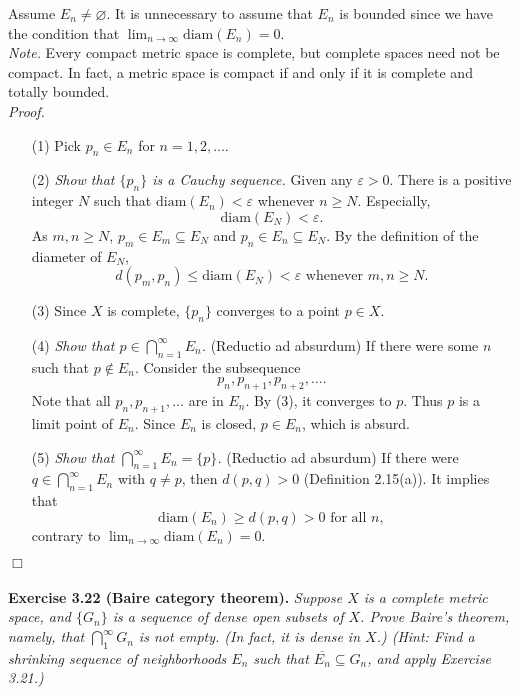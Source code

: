 \documentclass{article}
\begin{document}
Assume $E_n \neq \varnothing$. It is unnecessary to assume that $E_n$ is bounded
since we have the condition that $\lim_{n \to \infty} \mathrm{diam}(E_n) = 0$.\\

\emph{Note.}
Every compact metric space is complete, but complete spaces need not be compact.
In fact, a metric space is compact if and only if it is complete and totally bounded. \\

\emph{Proof.}
\begin{enumerate}
\item[(1)]
Pick $p_n \in E_n$ for $n = 1, 2, \ldots$.
\item[(2)]
\emph{Show that $\{p_n\}$ is a Cauchy sequence.}
Given any $\varepsilon > 0$.
There is a positive integer $N$ such that
$\mathrm{diam}(E_n) < \varepsilon$ whenever $n \geq N$.
Especially, $$\mathrm{diam}(E_N) < \varepsilon.$$
As $m, n \geq N$, $p_m \in E_m \subseteq E_N$ and $p_n \in E_n \subseteq E_N$.
By the definition of the diameter of $E_N$,
$$d(p_m,p_n) \leq \mathrm{diam}(E_N) < \varepsilon \text{ whenever } m,n \geq N.$$
\item[(3)]
Since $X$ is complete, $\{p_n\}$ converges to a point $p \in X$.
\item[(4)]
\emph{Show that $p \in \bigcap_{n=1}^{\infty} E_n$.}
(Reductio ad absurdum)
If there were some $n$ such that $p \not\in E_{n}$.
Consider the subsequence
$$p_{n}, p_{n+1}, p_{n+2}, \ldots.$$
Note that all $p_{n}, p_{n+1}, \ldots$ are in $E_n$.
By (3), it converges to $p$. Thus $p$ is a limit point of $E_n$.
Since $E_n$ is closed, $p \in E_n$, which is absurd.
\item[(5)]
\emph{Show that $\bigcap_{n=1}^{\infty} E_n = \{p\}$.}
(Reductio ad absurdum)
If there were $q \in \bigcap_{n=1}^{\infty} E_n$ with $q \neq p$,
then $d(p,q) > 0$ (Definition 2.15(a)).
It implies that
$$\mathrm{diam}(E_n)
\geq d(p,q) > 0 \text{ for all } n,$$
contrary to $\lim_{n \to \infty} \mathrm{diam}(E_n) = 0$.
\end{enumerate}
$\Box$ \\\\






\textbf{Exercise 3.22 (Baire category theorem).}
\emph{Suppose $X$ is a complete metric space,
and $\{G_n\}$ is a sequence of dense open subsets of $X$.
Prove Baire's theorem, namely, that $\bigcap^\infty_1{G_n}$ is not empty.
(In fact, it is dense in $X$.)
(Hint: Find a shrinking sequence of neighborhoods $E_n$ such
that $\overline{E_n} \subseteq G_n$, and apply Exercise 3.21.) } \\
\end{document}
